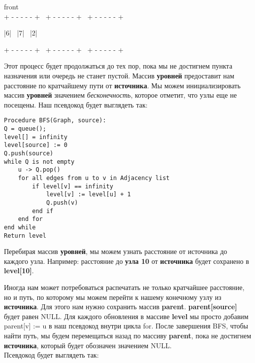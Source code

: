 \begin{tcolorbox}
\hspace{3.35cm}front \\
{\tiny{+ - - - - - +} \ \tiny{+ - - - - - +} \ \tiny{+ - - - - - +}}

\hspace{0.4mm}|\hspace{4.2mm}6\hspace{4.2mm}| \ |\hspace{4.2mm}7\hspace{4.2mm}| \ |\hspace{4mm}2\hspace{4mm}|

{\tiny{+ - - - - - +} \ \tiny{+ - - - - - +} \ \tiny{+ - - - - - +}}
\end{tcolorbox}

\vspace{\baselineskip}

Этот процесс будет продолжаться до тех пор, пока мы не достигнем пункта назначения или очередь не станет пустой. Массив \textbf{уровней} предоставит нам расстояние по кратчайшему пути от \textbf{источника}. Мы можем инициализировать массив \textbf{уровней} значением \textit{бесконечность}, которое отметит, что узлы еще не посещены. Наш псевдокод будет выглядеть так:

\begin{tcolorbox}
\begin{verbatim}
Procedure BFS(Graph, source): 
Q = queue(); 
level[] = infinity 
level[source] := 0 
Q.push(source) 
while Q is not empty    
	u -> Q.pop()    
	for all edges from u to v in Adjacency list        
		if level[v] == infinity            
			level[v] := level[u] + 1            
			Q.push(v)        
		end if    
	end for 
end while 
Return level
\end{verbatim}
\end{tcolorbox}

Перебирая массив \textbf{уровней}, мы можем узнать расстояние от источника до каждого узла. Например: расстояние до \textbf{узла 10} от \textbf{источника} будет сохранено в \textbf{level[10]}.

\vspace{\baselineskip}

Иногда нам может потребоваться распечатать не только кратчайшее расстояние, но и путь, по которому мы можем перейти к нашему конечному узлу из \textbf{источника}. Для этого нам нужно сохранить массив \textbf{parent}. \textbf{parent[source]} будет равен NULL. Для каждого обновления в массиве \textbf{level} мы просто добавим { parent[v] := u} в наш псевдокод внутри цикла for. После завершения BFS, чтобы найти путь, мы будем перемещаться назад по массиву \textbf{parent}, пока не достигнем \textbf{источника}, который будет обозначен значением NULL. \\
Псевдокод будет выглядеть так:


